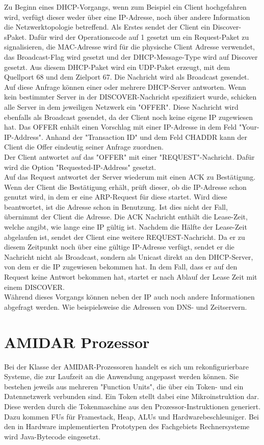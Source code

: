 Zu Beginn eines DHCP-Vorgangs, wenn zum Beispiel ein Client hochgefahren wird, verfügt dieser weder über eine IP-Adresse, noch über andere Information die Netzwerktopologie betreffend. Als Erstes sendet der Client ein Discover-sPaket. Dafür wird der Operationscode auf 1 gesetzt um ein Request-Paket zu signalisieren, die MAC-Adresse wird für die physische Client Adresse verwendet, das Broadcast-Flag wird gesetzt und der DHCP-Message-Type wird auf Discover gesetzt. Aus diesem DHCP-Paket wird ein UDP-Paket erzeugt, mit dem Quellport  68 und dem Zielport 67. Die Nachricht wird als Broadcast gesendet. \\
Auf diese Anfrage können einer oder mehrere DHCP-Server antworten. Wenn kein bestimmter Server in der DISCOVER-Nachricht spezifiziert wurde, schicken alle Server in dem jeweiligen Netzwerk ein "{}OFFER". Diese Nachricht wird ebenfalls als Broadcast gesendet, da der Client noch keine eigene IP zugewiesen hat. Das OFFER enhält einen Vorschlag mit einer IP-Adresse in dem Feld "Your-IP-Address". Anhand der "Transaction ID"{} und dem Feld CHADDR kann der Client die Offer eindeutig seiner Anfrage zuordnen. \\
Der Client antwortet auf das "{}OFFER"{} mit einer {}"REQUEST"{}-Nachricht. Dafür wird die Option "Requested-IP-Address"{} gesetzt. \\
Auf das Request antwortet der Server wiederum mit einen ACK zu Bestätigung. Wenn der Client die Bestätigung erhält, prüft dieser, ob die IP-Adresse schon genutzt wird, in dem er eine ARP-Request für diese startet. Wird diese beantwortet, ist die Adresse schon in Benutzung. Ist dies nicht der Fall, übernimmt der Client die Adresse. 
Die ACK Nachricht enthält die Lease-Zeit, welche angibt, wie lange eine IP gültig ist. 
Nachdem die Hälfte der Lease-Zeit abgelaufen ist, sendet der Client eine weitere REQUEST-Nachricht. Da er zu diesem Zeitpunkt noch über eine gültige IP-Adresse verfügt, sendet er die Nachricht nicht als Broadcast, sondern als Unicast direkt an den DHCP-Server, von dem er die IP zugewiesen bekommen hat. In dem Fall, dass er auf den Request keine Antwort bekommen hat, startet er nach Ablauf der Lease Zeit mit einem DISCOVER.\\
Während dieses Vorgangs können neben der IP auch noch andere Informationen abgefragt werden. Wie beispielsweise die Adressen von DNS- und Zeitservern.




\section{AMIDAR Prozessor}
Bei der Klasse der AMIDAR-Prozessoren handelt es sich um rekonfigurierbare Systeme, die zur Laufzeit an die Anwendung angepasst werden können. Sie bestehen jeweils aus mehreren {}"Function Units"{}, die über ein Token- und ein Datennetzwerk verbunden sind. Ein Token stellt dabei eine Mikroinstruktion dar. Diese werden durch die Tokenmaschine aus den Prozessor-Instruktionen generiert. Dazu kommen FUs für Framestack, Heap, ALUs und Hardwarebeschleuniger. Bei den in Hardware implementierten Prototypen des Fachgebiets Rechnersysteme wird Java-Bytecode eingesetzt.

